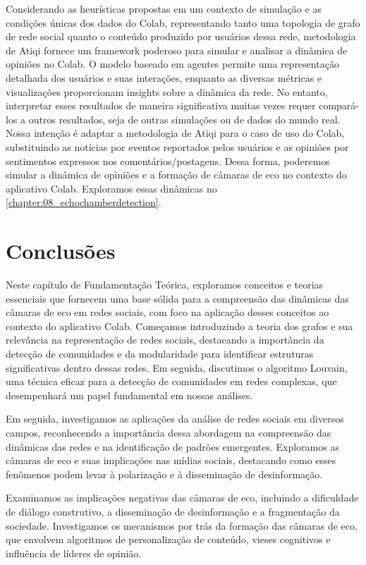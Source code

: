 Considerando as heurísticas propostas em um contexto de simulação e as condições únicas dos dados do Colab, representando tanto uma topologia de grafo de rede social quanto o conteúdo produzido por usuários dessa rede, metodologia de Atiqi fornece um framework poderoso para simular e analisar a dinâmica de opiniões no Colab. O modelo baseado em agentes permite uma representação detalhada dos usuários e suas interações, enquanto as diversas métricas e visualizações proporcionam insights sobre a dinâmica da rede. No entanto, interpretar esses resultados de maneira significativa muitas vezes requer compará-los a outros resultados, seja de outras simulações ou de dados do mundo real. Nossa intenção é adaptar a metodologia de Atiqi para o caso de uso do Colab, substituindo as notícias por eventos reportados pelos usuários e as opiniões por sentimentos expressos nos comentários/postagens. Dessa forma, poderemos simular a dinâmica de opiniões e a formação de câmaras de eco no contexto do aplicativo Colab. Exploramos essas dinâmicas no \autoref{chapter:08_echochamberdetection}.

\section{Conclusões}
Neste capítulo de Fundamentação Teórica, exploramos conceitos e teorias essenciais que fornecem uma base sólida para a compreensão das dinâmicas das câmaras de eco em redes sociais, com foco na aplicação desses conceitos ao contexto do aplicativo Colab. Começamos introduzindo a teoria dos grafos e sua relevância na representação de redes sociais, destacando a importância da detecção de comunidades e da modularidade para identificar estruturas significativas dentro dessas redes. Em seguida, discutimos o algoritmo Louvain, uma técnica eficaz para a detecção de comunidades em redes complexas, que desempenhará um papel fundamental em nossas análises.

Em seguida, investigamos as aplicações da análise de redes sociais em diversos campos, reconhecendo a importância dessa abordagem na compreensão das dinâmicas das redes e na identificação de padrões emergentes. Exploramos as câmaras de eco e suas implicações nas mídias sociais, destacando como esses fenômenos podem levar à polarização e à disseminação de desinformação.

Examinamos as implicações negativas das câmaras de eco, incluindo a dificuldade de diálogo construtivo, a disseminação de desinformação e a fragmentação da sociedade. Investigamos os mecanismos por trás da formação das câmaras de eco, que envolvem algoritmos de personalização de conteúdo, vieses cognitivos e influência de líderes de opinião.

